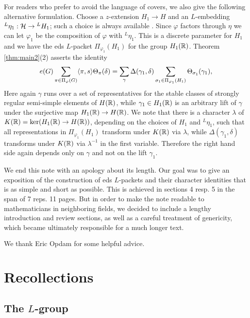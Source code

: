 \documentclass{article}
\theoremstyle{definition}
\numberwithin{equation}{section}
\renewcommand{\-}{\hyp{}}
\begin{document}
For readers who prefer to avoid the language of covers, we also give the following alternative formulation. Choose a $z$-extension $H_1 \to H$ and an $L$-embedding ${^L\eta_1} : \mathcal{H} \to {^LH_1}$; such a choice is always available \cite[\S2.2]{KS99}. Since $\varphi$ factors through $\eta$ we can let $\varphi_1$ be the composition of $\varphi$ with $^L\eta_1$. This is a discrete parameter for $H_1$ and we have the eds $L$-packet $\Pi_{\varphi_1}(H_1)$ for the group $H_1(\mathbb{R})$. Theorem \ref{thm:main2}(2) asserts the identity
\begin{equation} \label{eq:s5}
	e(G)\sum_{\pi \in \Pi_\varphi(G)}\langle\pi,s\rangle\Theta_\pi(\delta) = \sum_\gamma \Delta(\gamma_1,\delta)\sum_{\sigma_1 \in \Pi_{\varphi_1}(H_1)} \Theta_{\sigma_1}(\gamma_1),
\end{equation}
Here again $\gamma$ runs over a set of representatives for the stable classes of strongly regular semi-simple elements of $H(\mathbb{R})$, while $\gamma_1 \in H_1(\mathbb{R})$ is an arbitrary lift of $\gamma$ under the surjective map $H_1(\mathbb{R}) \to H(\mathbb{R})$. We note that there is a character $\lambda$ of $K(\mathbb{R}) = \textrm{ker}(H_1(\mathbb{R}) \to H(\mathbb{R}))$, depending on the choices of $H_1$ and $^L\eta_1$, such that all representations in $\Pi_{\varphi_1}(H_1)$ transform under $K(\mathbb{R})$ via $\lambda$, while $\Delta(\gamma_1,\delta)$ transforms under $K(\mathbb{R})$ via $\lambda^{-1}$ in the first variable. Therefore the right hand side again depends only on $\gamma$ and not on the lift $\gamma_1$.

We end this note with an apology about its length. Our goal was to give an exposition of the construction of eds $L$-packets and their character identities that is as simple and short as possible. This is achieved in sections 4 resp. 5 in the span of 7 reps. 11 pages. But in order to make the note readable to mathematicians in neighboring fields, we decided to include a lengthy introduction and review sections, as well as a careful treatment of genericity, which became ultimately responsible for a much longer text. 

We thank Eric Opdam for some helpful advice.

\section{Recollections} \label{sec:recoll}

\subsection{The $L$\-group}
\end{document}
